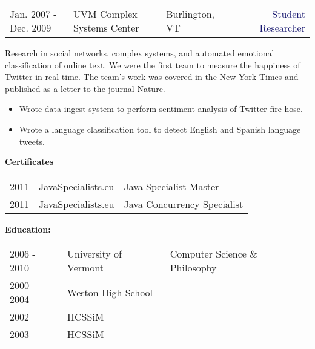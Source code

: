 \documentclass{article}
\begin{document}
\pagebreak
\vspace{15pt}\begin{tabularx}{\textwidth}{@{}lllXr}
  Jan. 2007 - Dec. 2009&\textcolor{Mahogany}{UVM Complex Systems Center}&\textcolor{Black!80}{Burlington, VT}&&\textcolor{MidnightBlue}{Student Researcher}
\end{tabularx}

\vspace{3pt} Research in social networks, complex systems, and automated  emotional classification of online text.
We were the first team to measure the happiness of Twitter in real time. The team's work was covered in the New York Times and published as a letter to the journal Nature.
\begin{multicols}{2}
  \begin{small}
    \begin{itemize}[leftmargin=*,label=\tiny{$\bullet$}]
    \item\begin{minipage}[t]{\linewidth}{Wrote data ingest system to perform sentiment analysis of Twitter fire-hose.}\end{minipage}
    \item\begin{minipage}[t]{\linewidth}{Wrote a language classification tool to detect English and Spanish language tweets.}\end{minipage}
    \end{itemize}
  \end{small} 
\end{multicols}

\vspace{10pt}\textbf{Certificates}

\vspace{3pt}\begin{tabular}{lll}
  2011 & JavaSpecialists.eu & Java Specialist Master\\
  2011 & JavaSpecialists.eu & Java Concurrency Specialist
\end{tabular}

\vspace{10pt}\textbf{Education:}

\vspace{3pt}\begin{tabular}{lll}
  2006 - 2010 & University of Vermont & Computer Science \& Philosophy\\
  2000 - 2004 & Weston High School &  \\
  2002 &  HCSSiM & \\
  2003 &  HCSSiM & \\ 
\end{tabular}
\end{document}
